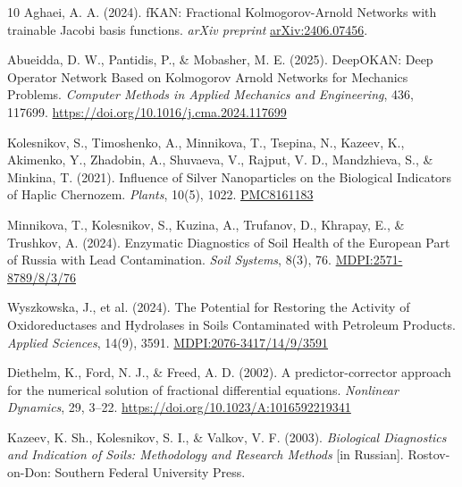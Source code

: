 \documentclass[10pt,twocolumn,a4paper]{article}
\begin{document}
\begin{thebibliography}{10}
Aghaei, A. A. (2024). fKAN: Fractional Kolmogorov-Arnold Networks with trainable Jacobi basis functions. \textit{arXiv preprint} \href{https://arxiv.org/abs/2406.07456}{arXiv:2406.07456}.

Abueidda, D. W., Pantidis, P., \& Mobasher, M. E. (2025). DeepOKAN: Deep Operator Network Based on Kolmogorov Arnold Networks for Mechanics Problems. \textit{Computer Methods in Applied Mechanics and Engineering}, 436, 117699. \href{https://doi.org/10.1016/j.cma.2024.117699}{https://doi.org/10.1016/j.cma.2024.117699}

Kolesnikov, S., Timoshenko, A., Minnikova, T., Tsepina, N., Kazeev, K., Akimenko, Y., Zhadobin, A., Shuvaeva, V., Rajput, V. D., Mandzhieva, S., \& Minkina, T. (2021). Influence of Silver Nanoparticles on the Biological Indicators of Haplic Chernozem. \textit{Plants}, 10(5), 1022. \href{https://pmc.ncbi.nlm.nih.gov/articles/PMC8161183/}{PMC8161183}

Minnikova, T., Kolesnikov, S., Kuzina, A., Trufanov, D., Khrapay, E., \& Trushkov, A. (2024). Enzymatic Diagnostics of Soil Health of the European Part of Russia with Lead Contamination. \textit{Soil Systems}, 8(3), 76. \href{https://www.mdpi.com/2571-8789/8/3/76}{MDPI:2571-8789/8/3/76}

Wyszkowska, J., et al. (2024). The Potential for Restoring the Activity of Oxidoreductases and Hydrolases in Soils Contaminated with Petroleum Products. \textit{Applied Sciences}, 14(9), 3591. \href{https://www.mdpi.com/2076-3417/14/9/3591}{MDPI:2076-3417/14/9/3591}

Diethelm, K., Ford, N. J., \& Freed, A. D. (2002). A predictor-corrector approach for the numerical solution of fractional differential equations. \textit{Nonlinear Dynamics}, 29, 3--22. \href{https://doi.org/10.1023/A:1016592219341}{https://doi.org/10.1023/A:1016592219341}

Kazeev, K. Sh., Kolesnikov, S. I., \& Valkov, V. F. (2003). \textit{Biological Diagnostics and Indication of Soils: Methodology and Research Methods} [in Russian]. Rostov-on-Don: Southern Federal University Press.

\end{thebibliography}
\end{document}
